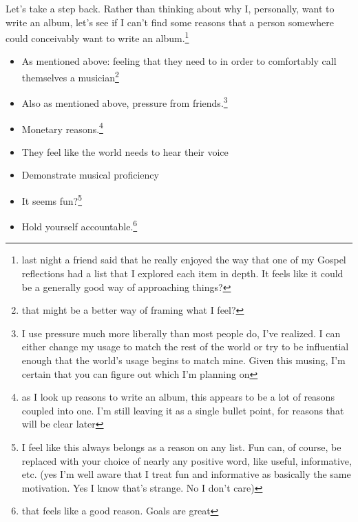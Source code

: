 \documentclass[12pt]{article}[titlepage]
\newcommand{\1}{\={a}}
\newcommand{\2}{\={e}}
\newcommand{\3}{\={\i}}
\newcommand{\4}{\=o}
\newcommand{\5}{\=u}
\newcommand{\6}{\={A}}
\renewcommand{\,}{\textsuperscript{,}}
\begin{document}
Let's take a step back.
Rather than thinking about why I, personally, want to write an album, let's see if I can't find some reasons that a person somewhere could conceivably want to write an album.\footnote{last night a friend said that he really enjoyed the way that one of my Gospel reflections had a list that I explored each item in depth. It feels like it could be a generally good way of approaching things?}

\begin{itemize}
\item As mentioned above: feeling that they need to in order to comfortably call themselves a musician\footnote{that might be a better way of framing what I feel?}
\item Also as mentioned above, pressure from friends.\footnote{I use pressure much more liberally than most people do, I've realized.
I can either change my usage to match the rest of the world or try to be influential enough that the world's usage begins to match mine.
Given this musing, I'm certain that you can figure out which I'm planning on}
\item Monetary reasons.\footnote{as I look up reasons to write an album, this appears to be a lot of reasons coupled into one. I'm still leaving it as a single bullet point, for reasons that will be clear later}
\item They feel like the world needs to hear their voice
\item Demonstrate musical proficiency
\item It seems fun?\footnote{I feel like this always belongs as a reason on any list. Fun can, of course, be replaced with your choice of nearly any positive word, like useful, informative, etc. (yes I'm well aware that I treat fun and informative as basically the same motivation. Yes I know that's strange. No I don't care)}
\item Hold yourself accountable.\footnote{that feels like a good reason. Goals are great}
\end{itemize}
\end{document}

